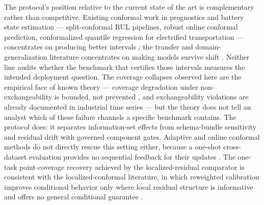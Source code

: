 \documentclass[
  number,
  preprint]{elsarticle}
\begin{document}
The protocol's position relative to the current state of the art is
complementary rather than competitive. Existing conformal work in
prognostics and battery state estimation --- split-conformal RUL
pipelines, robust online conformal prediction, conformalized quantile
regression for electrified transportation --- concentrates on producing
better intervals
\citep{xu2026uncertaintyaware, wang2025robust, javanmardi2023conformal, piao2025crulp, soon2026enhancing};
the transfer and domain-generalization literature concentrates on making
models survive shift
\citep{nejjar2026uncertaintyguided, fei2026decoupled}. Neither line
audits whether the benchmark that certifies those intervals measures the
intended deployment question. The coverage collapses observed here are
the empirical face of known theory --- coverage degradation under
non-exchangeability is bounded, not prevented
\citep{barber2023beyond, oliveira2024split}, and exchangeability
violations are already documented in industrial time series
\citep{zhang2025uncertainty} --- but the theory does not tell an analyst
which of these failure channels a specific benchmark contains. The
protocol does: it separates information-set effects from schema-bundle
sensitivity and residual drift with governed component gates. Adaptive
and online conformal methods do not directly rescue this setting either,
because a one-shot cross-dataset evaluation provides no sequential
feedback for their updates
\citep{gibbs2021adaptive, gibbs2024conformal}. The one-task
point-coverage recovery achieved by the localized-residual comparator is
consistent with the localized-conformal literature, in which reweighted
calibration improves conditional behavior only where local residual
structure is informative and offers no general conditional guarantee
\citep{guan2022localized, hore2024conformal}.
\end{document}
